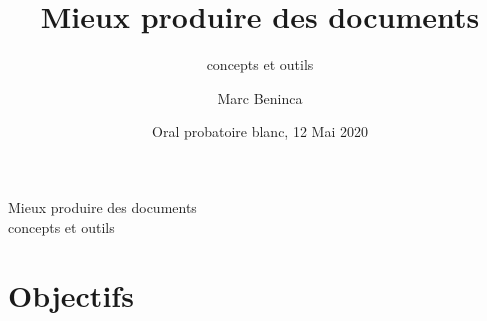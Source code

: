 \documentclass{beamer}
\def\hititle{Mieux produire des documents}
\def\lotitle{concepts et outils}
\begin{document}
\title[\hititle]{\hititle}
\subtitle{\lotitle}
\author[M. Beninca]{Marc Beninca}
\date[Blanc 2020]{Oral probatoire blanc, 12 Mai 2020}
\maketitle
\begin{frame}{\hititle\\\lotitle}
\begin{multicols}{2}\tableofcontents\end{multicols}\end{frame}
\section{Objectifs}
\end{document}
